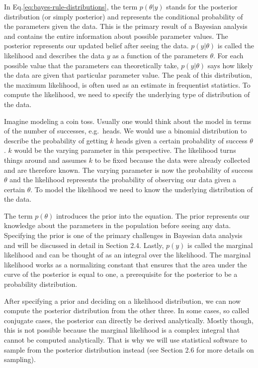 \documentclass[
  doc,12pt,floatsintext]{apa7}
\begin{document}
In Eq.\eqref{eq:bayes-rule-distributions}, the term \(p(\theta|y)\) stands for the posterior distribution (or simply posterior) and represents the conditional probability of the parameters given the data. This is the primary result of a Bayesian analysis and contains the entire information about possible parameter values. The posterior represents our updated belief after seeing the data. \(p(y|\theta)\) is called the likelihood and describes the data \(y\) as a function of the parameters \(\theta\). For each possible value that the parameters can theoretically take, \(p(y|\theta)\) says how likely the data are given that particular parameter value. The peak of this distribution, the maximum likelihood, is often used as an estimate in frequentist statistics. To compute the likelihood, we need to specify the underlying type of distribution of the data.

Imagine modeling a coin toss. Usually one would think about the model in terms of the number of successes, e.g.~heads. We would use a binomial distribution to describe the probability of getting \(k\) heads given a certain probability of success \(\theta\). \(k\) would be the varying parameter in this perspective. The likelihood turns things around and assumes \(k\) to be fixed because the data were already collected and are therefore known. The varying parameter is now the probability of success \(\theta\) and the likelihood represents the probability of observing our data given a certain \(\theta\). To model the likelihood we need to know the underlying distribution of the data.

The term \(p(\theta)\) introduces the prior into the equation. The prior represents our knowledge about the parameters in the population before seeing any data. Specifying the prior is one of the primary challenges in Bayesian data analysis and will be discussed in detail in Section 2.4. Lastly, \(p(y)\) is called the marginal likelihood and can be thought of as an integral over the likelihood. The marginal likelihood works as a normalizing constant that ensures that the area under the curve of the posterior is equal to one, a prerequisite for the posterior to be a probability distribution.

After specifying a prior and deciding on a likelihood distribution, we can now compute the posterior distribution from the other three. In some cases, so called conjugate cases, the posterior can directly be derived analytically. Mostly though, this is not possible because the marginal likelihood is a complex integral that cannot be computed analytically. That is why we will use statistical software to sample from the posterior distribution instead (see Section 2.6 for more details on sampling).
\end{document}
